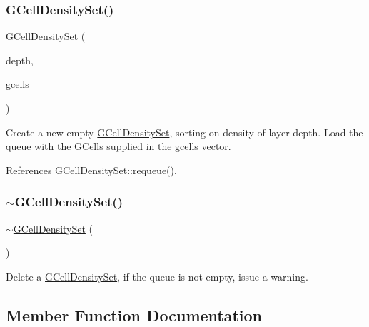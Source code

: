 \subsubsection{\texorpdfstring{G\+Cell\+Density\+Set()}{GCellDensitySet()}\hspace{0.1cm}{\footnotesize\ttfamily [2/2]}}
{\footnotesize\ttfamily \mbox{\hyperlink{classKatabatic_1_1GCellDensitySet}{G\+Cell\+Density\+Set}} (\begin{DoxyParamCaption}\item[{unsigned int}]{depth,  }\item[{const std\+::vector$<$ \mbox{\hyperlink{classKatabatic_1_1GCell}{G\+Cell}} $\ast$$>$ \&}]{gcells }\end{DoxyParamCaption})}

Create a new empty \mbox{\hyperlink{classKatabatic_1_1GCellDensitySet}{G\+Cell\+Density\+Set}}, sorting on density of layer {\ttfamily depth}. Load the queue with the G\+Cells supplied in the {\ttfamily gcells} vector. 

References G\+Cell\+Density\+Set\+::requeue().

\mbox{\label{classKatabatic_1_1GCellDensitySet_aef015ff8dc7d34fcb907281f71bb0003}} 
\subsubsection{\texorpdfstring{$\sim$\+G\+Cell\+Density\+Set()}{~GCellDensitySet()}}
{\footnotesize\ttfamily $\sim$\mbox{\hyperlink{classKatabatic_1_1GCellDensitySet}{G\+Cell\+Density\+Set}} (\begin{DoxyParamCaption}{ }\end{DoxyParamCaption})}

Delete a \mbox{\hyperlink{classKatabatic_1_1GCellDensitySet}{G\+Cell\+Density\+Set}}, if the queue is not empty, issue a warning. 

\subsection{Member Function Documentation}
\mbox{\label{classKatabatic_1_1GCellDensitySet_a644718bb2fb240de962dc3c9a1fdf0dc}} 
